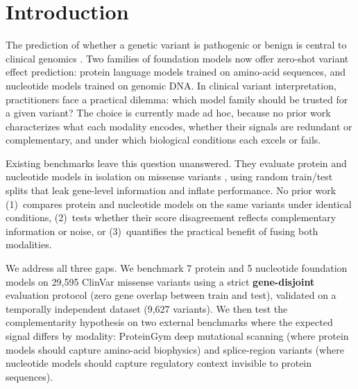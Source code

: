 \documentclass[9pt]{article}
\begin{document}
\section{Introduction}

The prediction of whether a genetic variant is pathogenic or benign is central to clinical genomics \cite{rentzsch2019predicting}. Two families of foundation models now offer zero-shot variant effect prediction: protein language models \cite{elnaggar2022prottrans, li2023esm1b, esm3team2024esm3, meier2021language} trained on amino-acid sequences, and nucleotide models \cite{dalla2024nucleotide, zeng2024dnabert2, nguyen2023hyenadna, singh2024genalm} trained on genomic DNA. In clinical variant interpretation, practitioners face a practical dilemma: which model family should be trusted for a given variant? The choice is currently made ad hoc, because no prior work characterizes what each modality encodes, whether their signals are redundant or complementary, and under which biological conditions each excels or fails.

Existing benchmarks leave this question unanswered. They evaluate protein and nucleotide models in isolation on missense variants \cite{promponas2020predicting, pei2021identifying}, using random train/test splits that leak gene-level information and inflate performance. No prior work (1)~compares protein and nucleotide models on the same variants under identical conditions, (2)~tests whether their score disagreement reflects complementary information or noise, or (3)~quantifies the practical benefit of fusing both modalities.

We address all three gaps. We benchmark 7 protein and 5 nucleotide foundation models on 29,595 ClinVar missense variants using a strict \textbf{gene-disjoint} evaluation protocol (zero gene overlap between train and test), validated on a temporally independent dataset (9,627 variants). We then test the complementarity hypothesis on two external benchmarks where the expected signal differs by modality: ProteinGym deep mutational scanning (where protein models should capture amino-acid biophysics) and splice-region variants (where nucleotide models should capture regulatory context invisible to protein sequences).
\end{document}
